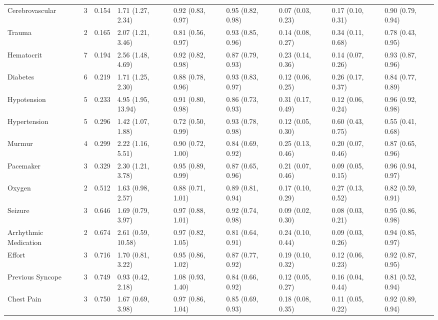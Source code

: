\begin{table}[ht]
\begin{tabular}{lrrllllll}
  Cerebrovascular &    3 & 0.154 & 1.71 (1.27, 2.34) & 0.92 (0.83, 0.97) & 0.95 (0.82, 0.98) & 0.07 (0.03, 0.23) & 0.17 (0.10, 0.31) & 0.90 (0.79, 0.94) \\ 
  Trauma &    2 & 0.165 & 2.07 (1.21, 3.46) & 0.81 (0.56, 0.97) & 0.93 (0.85, 0.96) & 0.14 (0.08, 0.27) & 0.34 (0.11, 0.68) & 0.78 (0.43, 0.95) \\ 
  Hematocrit &    7 & 0.194 & 2.56 (1.48, 4.69) & 0.92 (0.82, 0.98) & 0.87 (0.79, 0.93) & 0.23 (0.14, 0.36) & 0.14 (0.07, 0.26) & 0.93 (0.87, 0.96) \\ 
  Diabetes &    6 & 0.219 & 1.71 (1.25, 2.30) & 0.88 (0.78, 0.96) & 0.93 (0.83, 0.97) & 0.12 (0.06, 0.25) & 0.26 (0.17, 0.37) & 0.84 (0.77, 0.89) \\ 
  Hypotension &    5 & 0.233 & 4.95 (1.95, 13.94) & 0.91 (0.80, 0.98) & 0.86 (0.73, 0.93) & 0.31 (0.17, 0.49) & 0.12 (0.06, 0.24) & 0.96 (0.92, 0.98) \\ 
  Hypertension &    5 & 0.296 & 1.42 (1.07, 1.88) & 0.72 (0.50, 0.99) & 0.93 (0.78, 0.98) & 0.12 (0.05, 0.30) & 0.60 (0.43, 0.75) & 0.55 (0.41, 0.68) \\ 
  Murmur &    4 & 0.299 & 2.22 (1.16, 5.51) & 0.90 (0.72, 1.00) & 0.84 (0.69, 0.92) & 0.25 (0.13, 0.46) & 0.20 (0.07, 0.46) & 0.87 (0.65, 0.96) \\ 
  Pacemaker &    3 & 0.329 & 2.30 (1.21, 3.78) & 0.95 (0.89, 0.99) & 0.87 (0.65, 0.96) & 0.21 (0.07, 0.46) & 0.09 (0.05, 0.15) & 0.96 (0.94, 0.97) \\ 
  Oxygen &    2 & 0.512 & 1.63 (0.98, 2.57) & 0.88 (0.71, 1.01) & 0.89 (0.81, 0.94) & 0.17 (0.10, 0.29) & 0.27 (0.13, 0.52) & 0.82 (0.59, 0.91) \\ 
  Seizure &    3 & 0.646 & 1.69 (0.79, 3.97) & 0.97 (0.88, 1.01) & 0.92 (0.74, 0.98) & 0.09 (0.02, 0.30) & 0.08 (0.03, 0.21) & 0.95 (0.86, 0.98) \\ 
  Arrhythmic Medication &    2 & 0.674 & 2.61 (0.59, 10.58) & 0.97 (0.82, 1.05) & 0.81 (0.64, 0.91) & 0.24 (0.10, 0.44) & 0.09 (0.03, 0.26) & 0.94 (0.85, 0.97) \\ 
  Effort &    3 & 0.716 & 1.70 (0.81, 3.22) & 0.95 (0.86, 1.02) & 0.87 (0.77, 0.92) & 0.19 (0.10, 0.32) & 0.12 (0.06, 0.23) & 0.92 (0.87, 0.95) \\ 
  Previous Syncope &    3 & 0.749 & 0.93 (0.42, 2.18) & 1.08 (0.93, 1.40) & 0.84 (0.66, 0.92) & 0.12 (0.05, 0.27) & 0.16 (0.04, 0.44) & 0.81 (0.52, 0.94) \\ 
  Chest Pain &    3 & 0.750 & 1.67 (0.69, 3.98) & 0.97 (0.86, 1.04) & 0.85 (0.69, 0.93) & 0.18 (0.08, 0.35) & 0.11 (0.05, 0.22) & 0.92 (0.89, 0.94) \\ 

\end{tabular}
\end{table}
